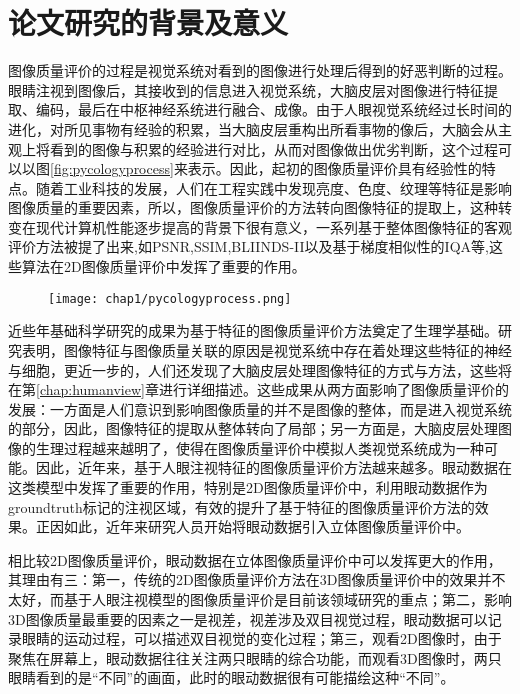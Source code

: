 \section{论文研究的背景及意义}
\label{sec:background}
图像质量评价的过程是视觉系统对看到的图像进行处理后得到的好恶判断的过程。眼睛注视到图像后，其接收到的信息进入视觉系统，大脑皮层对图像进行特征提取、编码，最后在中枢神经系统进行融合、成像\parencite{zhu20143d}。由于人眼视觉系统经过长时间的进化，对所见事物有经验的积累，当大脑皮层重构出所看事物的像后，大脑会从主观上将看到的图像与积累的经验进行对比，从而对图像做出优劣判断\parencite{liu2010scene}，这个过程可以以图\ref{fig:pycologyprocess}来表示。因此，起初的图像质量评价具有经验性的特点。随着工业科技的发展，人们在工程实践中发现亮度、色度、纹理等特征是影响图像质量的重要因素，所以，图像质量评价的方法转向图像特征的提取上，这种转变在现代计算机性能逐步提高的背景下很有意义，一系列基于整体图像特征的客观评价方法被提了出来,如PSNR,SSIM\parencite{wang2003multiscale},BLIINDS-II\parencite{saad2012blind}以及基于梯度相似性的IQA\parencite{liu2012image}等,这些算法在2D图像质量评价中发挥了重要的作用。
\begin{figure}[!htp]
  \centering
  \texttt{[image: chap1/pycologyprocess.png]}
\end{figure}

近些年基础科学研究的成果为基于特征的图像质量评价方法奠定了生理学基础。研究表明，图像特征与图像质量关联的原因是视觉系统中存在着处理这些特征的神经与细胞\parencite{hubel1962receptive}，更近一步的，人们还发现了大脑皮层处理图像特征的方式与方法\parencite{barlow1967neural,fleet1996neural}，这些将在第\ref{chap:humanview}章进行详细描述。这些成果从两方面影响了图像质量评价的发展：一方面是人们意识到影响图像质量的并不是图像的整体，而是进入视觉系统的部分，因此，图像特征的提取从整体转向了局部；另一方面是，大脑皮层处理图像的生理过程越来越明了，使得在图像质量评价中模拟人类视觉系统成为一种可能。因此，近年来，基于人眼注视特征的图像质量评价方法越来越多\parencite{wang2002no,zhang2011fsim,wang2004video,chen2006gradient}。眼动数据在这类模型中发挥了重要的作用\parencite{fliegel2008eyetracking,gide2012comparative}，特别是2D图像质量评价中，利用眼动数据作为groundtruth标记的注视区域，有效的提升了基于特征的图像质量评价方法的效果\parencite{gidevisual,meining2010eye}。正因如此，近年来研究人员开始将眼动数据引入立体图像质量评价中。

相比较2D图像质量评价，眼动数据在立体图像质量评价中可以发挥更大的作用，其理由有三：第一，传统的2D图像质量评价方法在3D图像质量评价中的效果并不太好\parencite{bensalma2013perceptual}，而基于人眼注视模型的图像质量评价是目前该领域研究的重点；第二，影响3D图像质量最重要的因素之一是视差，视差涉及双目视觉过程，眼动数据可以记录眼睛的运动过程，可以描述双目视觉的变化过程；第三，观看2D图像时，由于聚焦在屏幕上，眼动数据往往关注两只眼睛的综合功能，而观看3D图像时，两只眼睛看到的是“不同”的画面，此时的眼动数据很有可能描绘这种“不同”。

